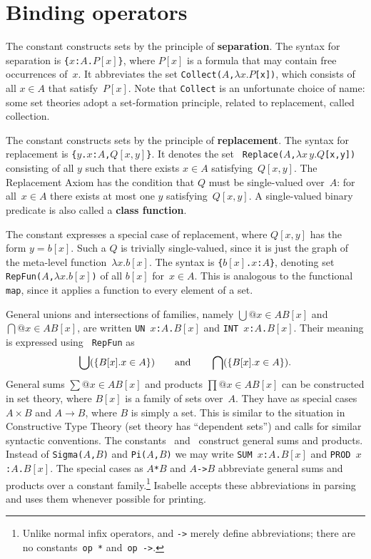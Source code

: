 \section{Binding operators}
The constant  constructs sets by the principle of {\bf
  separation}.  The syntax for separation is \hbox{\tt\{$x$:$A$.$P[x]$\}},
where $P[x]$ is a formula that may contain free occurrences of~$x$.  It
abbreviates the set {\tt Collect($A$,$\lambda x.P$[x])}, which consists of
all $x\in A$ that satisfy~$P[x]$.  Note that {\tt Collect} is an
unfortunate choice of name: some set theories adopt a set-formation
principle, related to replacement, called collection.

The constant  constructs sets by the principle of {\bf
  replacement}.  The syntax for replacement is
\hbox{\tt\{$y$.$x$:$A$,$Q[x,y]$\}}.  It denotes the set {\tt
  Replace($A$,$\lambda x\,y.Q$[x,y])} consisting of all $y$ such that there
exists $x\in A$ satisfying~$Q[x,y]$.  The Replacement Axiom has the
condition that $Q$ must be single-valued over~$A$: for all~$x\in A$ there
exists at most one $y$ satisfying~$Q[x,y]$.  A single-valued binary
predicate is also called a {\bf class function}.

The constant  expresses a special case of replacement,
where $Q[x,y]$ has the form $y=b[x]$.  Such a $Q$ is trivially
single-valued, since it is just the graph of the meta-level
function~$\lambda x.b[x]$.  The syntax is \hbox{\tt\{$b[x]$.$x$:$A$\}},
denoting set {\tt RepFun($A$,$\lambda x.b[x]$)} of all $b[x]$ for~$x\in A$.
This is analogous to the \ML{} functional {\tt map}, since it applies a
function to every element of a set.

General unions and intersections of families, namely $\bigcup@{x\in A}B[x]$ and
$\bigcap@{x\in A}B[x]$, are written \hbox{\tt UN $x$:$A$.$B[x]$} and
\hbox{\tt INT $x$:$A$.$B[x]$}.  Their meaning is expressed using {\tt
RepFun} as
\[ \bigcup(\{B[x]. x\in A\}) \qquad\hbox{and}\qquad 
   \bigcap(\{B[x]. x\in A\}). 
\]
General sums $\sum@{x\in A}B[x]$ and products $\prod@{x\in A}B[x]$ can be
constructed in set theory, where $B[x]$ is a family of sets over~$A$.  They
have as special cases $A\times B$ and $A\to B$, where $B$ is simply a set.
This is similar to the situation in Constructive Type Theory (set theory
has ``dependent sets'') and calls for similar syntactic conventions.  The
constants~ and~ construct general sums and
products.  Instead of {\tt Sigma($A$,$B$)} and {\tt Pi($A$,$B$)} we may write
\hbox{\tt SUM $x$:$A$.$B[x]$} and \hbox{\tt PROD $x$:$A$.$B[x]$}.  
%
The special cases as \hbox{\tt$A$*$B$} and \hbox{\tt$A$->$B$} abbreviate
general sums and products over a constant family.\footnote{Unlike normal
infix operators, {\tt*} and {\tt->} merely define abbreviations; there are
no constants~{\tt op~*} and~\hbox{\tt op~->}.} Isabelle accepts these
abbreviations in parsing and uses them whenever possible for printing.

